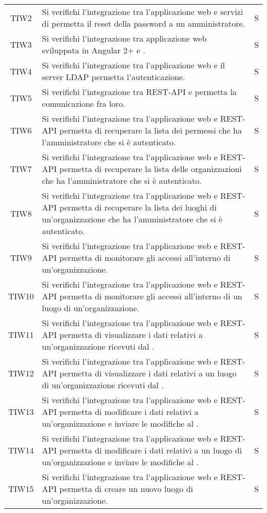 {\begin{longtable}{ c C{13cm} C{1cm}}
TIW2 & Si verifichi l’integrazione tra l’applicazione web e servizi di  permetta il reset della password a un amministratore. & S \\
TIW3 & Si verifichi l’integrazione tra applicazione web sviluppata in Angular 2+ e .& S \\
TIW4 & Si verifichi l’integrazione tra l’applicazione web e il server LDAP permetta l’autenticazione.& S \\
TIW5 & Si verifichi l’integrazione tra REST-API e  permetta la comunicazione fra loro.& S \\
TIW6 & Si verifichi l’integrazione tra l’applicazione web e REST-API permetta di recuperare la lista dei permessi che ha l’amministratore che si è autenticato.& S \\
TIW7 & Si verifichi l’integrazione tra l’applicazione web e REST-API permetta di recuperare la lista delle organizzazioni che ha l’amministratore che si è autenticato.& S \\
TIW8 & Si verifichi l’integrazione tra l’applicazione web e REST-API permetta di recuperare la lista dei luoghi di un’organizzazione che ha l’amministratore che si è autenticato.& S \\
TIW9 & Si verifichi l’integrazione tra l’applicazione web e REST-API permetta di monitorare gli accessi all’interno di un’organizzazione.& S \\
TIW10 & Si verifichi l’integrazione tra l’applicazione web e REST-API permetta di monitorare gli accessi all’interno di un luogo di un’organizzazione.& S \\
TIW11 & Si verifichi l’integrazione tra l’applicazione web e REST-API permetta di visualizzare i dati relativi a un’organizzazione ricevuti dal .& S \\
TIW12 & Si verifichi l’integrazione tra l’applicazione web e REST-API permetta di visualizzare i dati relativi a un luogo di un’organizzazione ricevuti dal .& S \\
TIW13 & Si verifichi l’integrazione tra l’applicazione web e REST-API permetta di modificare i dati relativi a un’organizzazione e inviare le modifiche al .& S \\
TIW14 & Si verifichi l’integrazione tra l’applicazione web e REST-API permetta di modificare i dati relativi a un luogo di un’organizzazione e inviare le modifiche al .& S \\
TIW15 & Si verifichi l’integrazione tra l’applicazione web e REST-API permetta di creare un nuovo luogo di un’organizzazione.& S \\

\end{longtable}}
